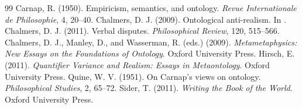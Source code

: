 \documentclass{situationist-preprint}
\begin{document}
\begin{thebibliography}{99}\small
{} Carnap, R. (1950). Empiricism, semantics, and ontology. \emph{Revue Internationale de Philosophie}, 4, 20--40.
 Chalmers, D. J. (2009). Ontological anti-realism. In \citet{ChalmersManleyWasserman2009}.
 Chalmers, D. J. (2011). Verbal disputes. \emph{Philosophical Review}, 120, 515--566.
 Chalmers, D. J., Manley, D., and Wasserman, R. (eds.) (2009). \emph{Metametaphysics: New Essays on the Foundations of Ontology}. Oxford University Press.
 Hirsch, E. (2011). \emph{Quantifier Variance and Realism: Essays in Metaontology}. Oxford University Press.
 Quine, W. V. (1951). On Carnap's views on ontology. \emph{Philosophical Studies}, 2, 65--72.
 Sider, T. (2011). \emph{Writing the Book of the World}. Oxford University Press.
\end{thebibliography}
\end{document}
